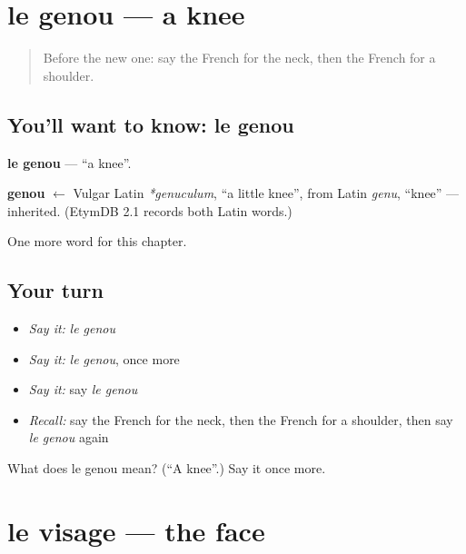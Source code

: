 \section[le genou]{le genou — a knee}

\label{lesson:FR-C50-genou}



\begin{quote}
Before the new one: say the French for the neck, then the French for a shoulder.
\end{quote}

\subsection*{You'll want to know: le genou}
\textbf{le genou} — \textquotedblleft{}a knee\textquotedblright{}.

\begin{cousinweb}
\textbf{genou} $\leftarrow$ Vulgar Latin \emph{*genuculum}, \textquotedblleft{}a little knee\textquotedblright{}, from Latin \emph{genu}, \textquotedblleft{}knee\textquotedblright{} — inherited. (EtymDB 2.1 records both Latin words.)
\end{cousinweb}

\begin{grammarlens}[title={What you've built}]
One more word for this chapter.
\end{grammarlens}

\subsection*{Your turn}
\begin{itemize}
\raggedright
  \item \emph{Say it:} \emph{le genou}
  \item \emph{Say it:} \emph{le genou}, once more
  \item \emph{Say it:} say \emph{le genou}
  \item \emph{Recall:} say the French for the neck, then the French for a shoulder, then say \emph{le genou} again
\end{itemize}

\begin{tcolorbox}[breakable,colback=teal!4,colframe=teal!35!black,title={Before you move on}]
What does le genou mean? (\textquotedblleft{}A knee\textquotedblright{}.) Say it once more.
\end{tcolorbox}
\section[le visage]{le visage — the face}

